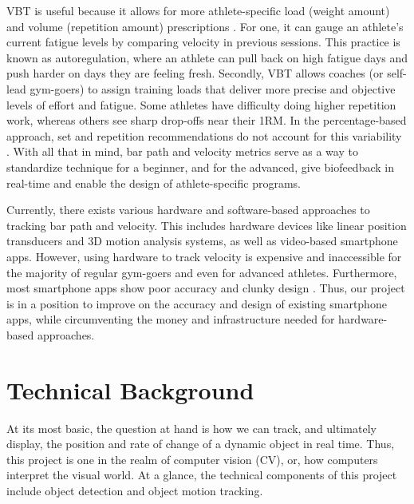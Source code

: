 \documentclass[10pt,twocolumn]{article}
\begin{document}
VBT is useful because it allows for more athlete-specific load (weight amount) and volume (repetition amount) prescriptions \cite{Weakley2021}.
For one, it can gauge an athlete's current fatigue levels by comparing velocity in previous sessions.
This practice is known as autoregulation, where an athlete can pull back on high fatigue days and push harder on days they are feeling fresh.
Secondly, VBT allows coaches (or self-lead gym-goers) to assign training loads that deliver more precise and objective levels of effort and fatigue.
Some athletes have difficulty doing higher repetition work, whereas others see sharp drop-offs near their 1RM. 
In the percentage-based approach, set and repetition recommendations do not account for this variability \cite{Balsalobre-Fernández2021}.
With all that in mind, bar path and velocity metrics serve as a way to standardize technique for a beginner, and for the advanced, give biofeedback in real-time and enable the design of athlete-specific programs. \par

Currently, there exists various hardware and software-based approaches to tracking bar path and velocity.
This includes hardware devices like linear position transducers and 3D motion analysis systems, as well as video-based smartphone apps. 
However, using hardware to track velocity is expensive and inaccessible for the majority of regular gym-goers and even for advanced athletes. 
Furthermore, most smartphone apps show poor accuracy and clunky design \cite{Martinez-Cava2020, Kasovic2021}.
Thus, our project is in a position to improve on the accuracy and design of existing smartphone apps, while circumventing the money and infrastructure needed for hardware-based approaches. \par

\section{Technical Background}
At its most basic, the question at hand is how we can track, and ultimately display, the position and rate of change of a dynamic object in real time.
Thus, this project is one in the realm of computer vision (CV), or, how computers interpret the visual world. 
At a glance, the technical components of this project include object detection and object motion tracking.\par
\end{document}
